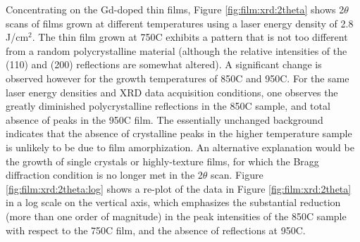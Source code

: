 Concentrating on the Gd-doped thin films, Figure \ref{fig:film:xrd:2theta} shows 2$\theta$ scans of films grown at different temperatures using a laser energy density of 2.8 J/cm$^2$. The thin film grown at 750\textdegree C exhibits a pattern that is not too different from a random polycrystalline material (although the relative intensities of the (110) and (200) reflections are somewhat altered). A significant change is observed however for the growth temperatures of 850\textdegree C and 950\textdegree C. For the same laser energy densities and XRD data acquisition conditions, one observes the greatly diminished polycrystalline reflections in the 850\textdegree C sample, and total absence of peaks in the 950\textdegree C film. The essentially unchanged background indicates that the absence of crystalline peaks in the higher temperature sample is unlikely to be due to film amorphization. An alternative explanation would be the growth of single crystals or highly-texture films, for which the Bragg diffraction condition is no longer met in the 2$\theta$ scan. Figure \ref{fig:film:xrd:2theta:log} shows a re-plot of the data in Figure \ref{fig:film:xrd:2theta} in a log scale on the vertical axis, which emphasizes the substantial reduction (more than one order of magnitude) in the peak intensities of the 850\textdegree C sample with respect to the 750\textdegree C film, and the absence of reflections at 950\textdegree C.

